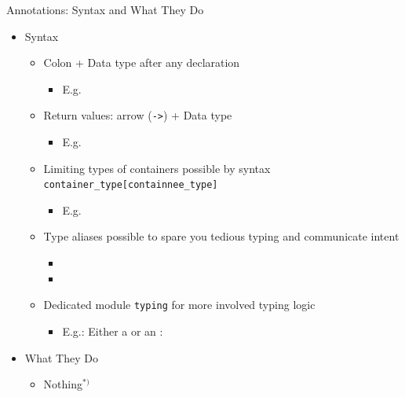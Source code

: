 \begin{frame}{Annotations: Syntax and What They Do}
%
\begin{itemize}
\item Syntax
	\begin{itemize}
	\item Colon + Data type after any declaration
		\begin{itemize}
		\item E.\;g. 
		\end{itemize}
	\item Return values: arrow (\texttt{->}) + Data type
		\begin{itemize}
		\item E.\;g. 
		\end{itemize}
	\item Limiting types of containers possible by syntax \texttt{container\_type[containnee\_type]}
		\begin{itemize}
		\item E.\;g. 
		\end{itemize}
	\item Type aliases possible to spare you tedious typing and communicate intent
		\begin{itemize}
		\item {} 
		\item {}
		\end{itemize}
	\item Dedicated module \texttt{typing} for more involved typing logic
		\begin{itemize}
		\item E.\;g.: Either a  or an : 
		\end{itemize}
	\end{itemize}
	\pause
\item What They Do
	\begin{itemize}
	\item Nothing$^{*)}$
	\end{itemize}
\end{itemize}
%
\end{frame}


